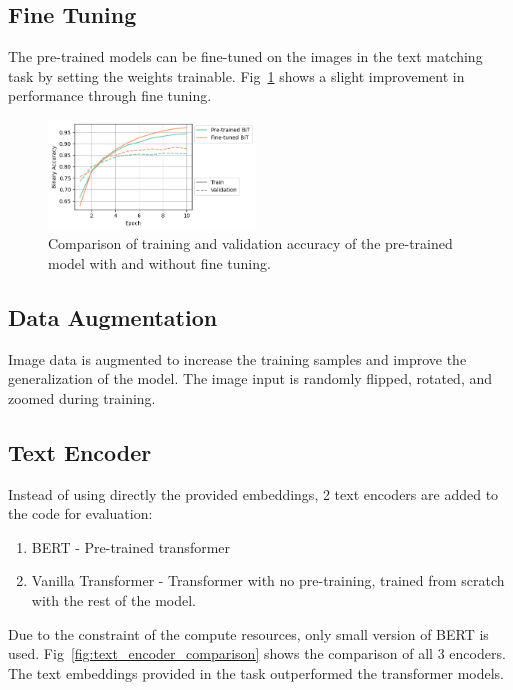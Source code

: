 \documentclass[conference]{IEEEtran}
\begin{document}
\subsection{Fine Tuning}

The pre-trained models can be fine-tuned on the images in the text matching task by setting the weights trainable. Fig~\ref{fig:trainable_comparison} shows a slight improvement in performance through fine tuning.

\begin{figure}
    \centering
    \includegraphics[width=0.49\textwidth]{trainable_comparison.png}
    \caption{Comparison of training and validation accuracy of the pre-trained model with and without fine tuning.}
    \label{fig:trainable_comparison}
\end{figure}

\subsection{Data Augmentation}

Image data is augmented to increase the training samples and improve the generalization of the model. The image input is randomly flipped, rotated, and zoomed during training.

\subsection{Text Encoder}

Instead of using directly the provided embeddings, 2 text encoders are added to the code for evaluation:

\begin{enumerate}
    \item BERT - Pre-trained transformer
    \item Vanilla Transformer - Transformer with no pre-training, trained from scratch with the rest of the model.
\end{enumerate}

Due to the constraint of the compute resources, only small version of BERT is used. Fig~\ref{fig:text_encoder_comparison} shows the comparison of all 3 encoders. The text embeddings provided in the task outperformed the transformer models.
\end{document}
